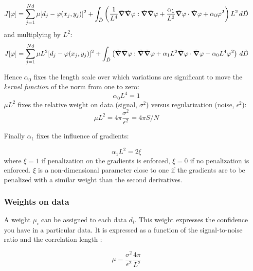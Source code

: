 \begin{equation}
J[\varphi]=\sum_{j=1}^{Nd}\mu[d_{j}-\varphi(x_{j},y_{j})]^{2}+
 \int_{\tilde{D}}\left(
\frac{1}{L^4} \tilde{\boldsymbol{\nabla}}\tilde{\boldsymbol{\nabla}}\varphi : \tilde{\boldsymbol{\nabla}}\tilde{\boldsymbol{\nabla}}\varphi + \frac{\alpha_{1}}{L^2}
\tilde{\boldsymbol{\nabla}}\varphi \cdot \tilde{\boldsymbol{\nabla}}\varphi + \alpha_{0} \varphi^{2} \right) L^2\,d\tilde{D}
\end{equation}
and multiplying by $L^{2}$:
\begin{equation}
{J}[\varphi]=\sum_{j=1}^{Nd}\mu L^2 [d_{j}-\varphi(x_{j},y_{j})]^{2}+
 \int_{\tilde{D}}\left(
 \tilde{\boldsymbol{\nabla}}\tilde{\boldsymbol{\nabla}}\varphi : \tilde{\boldsymbol{\nabla}}\tilde{\boldsymbol{\nabla}}\varphi + { \alpha_{1} L^2}
\tilde{\boldsymbol{\nabla}}\varphi \cdot \tilde{\boldsymbol{\nabla}}\varphi + \alpha_{0} L^4 \varphi^{2} \right) \,d\tilde{D}
\label{divaformulaadim}
\end{equation}


Hence $\alpha_0$ fixes the length scale over which variations are significant to move the \textit{kernel function} of the norm from one to zero:
\begin{equation}
\alpha_0 L^4 = 1
\end{equation}
$ \mu L^2$ fixes the relative weight on data (signal, $\sigma^2$) versus regularization (noise, $\epsilon^2$):
\begin{equation}
\mu L^2= 4 \pi \frac{\sigma^2}{\epsilon^2}= 4 \pi S/N 
\label{defmu}
\end{equation}

Finally  $\alpha_1$ fixes the influence of gradients:

\begin{equation}
\alpha_1 L^2 = 2 \xi
\end{equation}
where $\xi=1$ if penalization on the gradients is enforced, $\xi=0$ if no penalization is enforced. $\xi$ is a non-dimensional parameter close to one if the gradients are to be penalized with a similar weight than the second derivatives.


\subsubsection{Weights on data}

A weight $\mu_i$ can be assigned to each data $d_i$. This weight expresses the confidence you have in a particular data. It is expressed as a function of the signal-to-noise ratio and the correlation length \citep{BRANKART96}: 

\begin{equation}
\mu=\frac{\sigma^{2}}{\epsilon^{2}} \frac{4 \pi}{L^{2}}
\end{equation}


